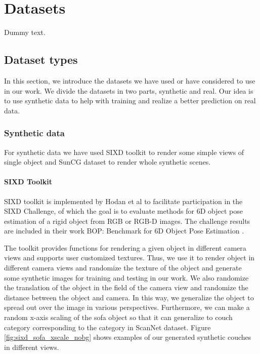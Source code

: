 \chapter{Datasets}

Dummy text.

\section{Dataset types}

In this section, we introduce the datasets we have used or have considered to use in our work. We divide the datasets in two parts, synthetic and real. Our idea is to use synthetic data to help with training and realize a better prediction on real data.

\subsection{Synthetic data}

For synthetic data we have used SIXD toolkit to render some simple views of single object and SunCG dataset to render whole synthetic scenes.

\subsubsection{SIXD Toolkit}

SIXD toolkit is implemented by Hodan et al to facilitate participation in the SIXD Challenge, of which the goal is to evaluate methods for 6D object pose estimation of a rigid object from RGB or RGB-D images. The challenge results are included in their work BOP: Benchmark for 6D Object Pose Estimation \cite{hodan2018bop}.

The toolkit provides functions for rendering a given object in different camera views and supports user customized textures. Thus, we use it to render object in different camera views and randomize the texture of the object and generate some synthetic images for training and testing in our work. We also randomize the translation of the object in the field of the camera view and randomize the distance between the object and camera. In this way, we generalize the object to spread out over the image in various perspectives. Furthermore, we can make a random x-axis scaling of the sofa object so that it can generalize to couch category corresponding to the category in ScanNet dataset. Figure \ref{fig:sixd_sofa_xscale_nobg} shows examples of our generated synthetic couches in different views.

